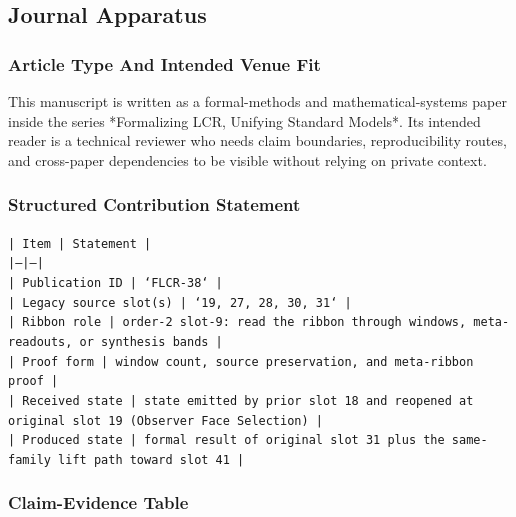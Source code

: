 \documentclass[11pt]{article}
\begin{document}
\subsection*{Journal Apparatus}

\subsubsection*{Article Type And Intended Venue Fit}

This manuscript is written as a formal-methods and mathematical-systems paper
inside the series *Formalizing LCR, Unifying Standard Models*. Its intended
reader is a technical reviewer who needs claim boundaries, reproducibility
routes, and cross-paper dependencies to be visible without relying on private
context.

\subsubsection*{Structured Contribution Statement}

\noindent\texttt{| Item | Statement |}\\
\noindent\texttt{|---|---|}\\
\noindent\texttt{| Publication ID | `FLCR-38` |}\\
\noindent\texttt{| Legacy source slot(s) | `19, 27, 28, 30, 31` |}\\
\noindent\texttt{| Ribbon role | order-2 slot-9: read the ribbon through windows, meta-readouts, or synthesis bands |}\\
\noindent\texttt{| Proof form | window count, source preservation, and meta-ribbon proof |}\\
\noindent\texttt{| Received state | state emitted by prior slot 18 and reopened at original slot 19 (Observer Face Selection) |}\\
\noindent\texttt{| Produced state | formal result of original slot 31 plus the same-family lift path toward slot 41 |}\\

\subsubsection*{Claim-Evidence Table}
\end{document}

